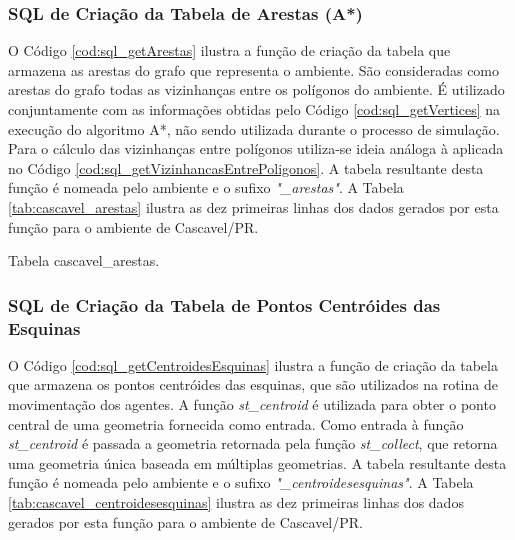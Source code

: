 \subsubsection{SQL de Criação da Tabela de Arestas (A*)}

O Código \ref{cod:sql_getArestas} ilustra a função de criação da tabela que armazena as arestas do grafo que representa o ambiente. São consideradas como arestas do grafo todas as vizinhanças entre os polígonos do ambiente. É utilizado conjuntamente com as informações obtidas pelo Código \ref{cod:sql_getVertices} na execução do algoritmo A*, não sendo utilizada durante o processo de simulação. Para o cálculo das vizinhanças entre polígonos utiliza-se ideia análoga à aplicada no Código \ref{cod:sql_getVizinhancasEntrePoligonos}. A tabela resultante desta função é nomeada pelo ambiente e o sufixo \textit{"\_arestas"}. A Tabela \ref{tab:cascavel_arestas} ilustra as dez primeiras linhas dos dados gerados por esta função para o ambiente de Cascavel/PR.



\begin{table}[H]
\centering
{}
\caption{Tabela cascavel\_arestas.}
\label{tab:cascavel_arestas}
\end{table}

\subsubsection{SQL de Criação da Tabela de Pontos Centróides das Esquinas}

O Código \ref{cod:sql_getCentroidesEsquinas} ilustra a função de criação da tabela que armazena os pontos centróides das esquinas, que são utilizados na rotina de movimentação dos agentes. A função \textit{st\_centroid} é utilizada para obter o ponto central de uma geometria fornecida como entrada. Como entrada à função \textit{st\_centroid} é passada a geometria retornada pela função \textit{st\_collect}, que retorna uma geometria única baseada em múltiplas geometrias. A tabela resultante desta função é nomeada pelo ambiente e o sufixo \textit{"\_centroidesesquinas"}. A Tabela \ref{tab:cascavel_centroidesesquinas} ilustra as dez primeiras linhas dos dados gerados por esta função para o ambiente de Cascavel/PR.


